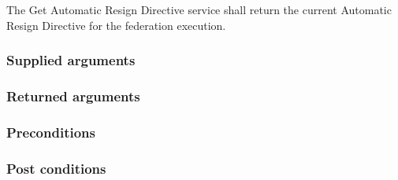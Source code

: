 \begin{compactstdpage}
    The Get Automatic Resign Directive service shall return the current Automatic Resign Directive for the federation execution.

    \subsubsection{Supplied arguments}


    \subsubsection{Returned arguments}


    \subsubsection{Preconditions}


    \subsubsection{Post conditions}

\end{compactstdpage}

\clearpage

